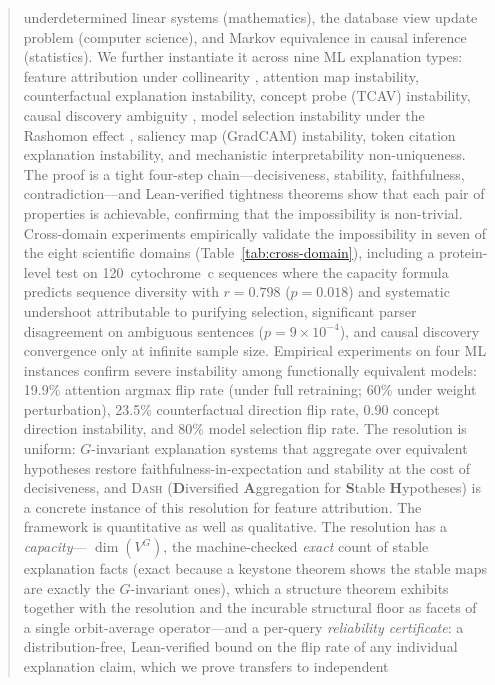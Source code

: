 \documentclass[11pt,a4paper]{article}
\newcommand{\DASH}{\textsc{Dash}}
\begin{document}
\begin{abstract}
underdetermined linear systems (mathematics), the database view update
problem (computer science), and Markov equivalence in causal inference
(statistics).  We further instantiate it across nine ML explanation types:
feature attribution under collinearity
\citep{bilodeau2024impossibility}, attention map instability, counterfactual
explanation instability, concept probe (TCAV) instability, causal discovery
ambiguity \citep{verma1991equivalence}, model selection instability under the
Rashomon effect \citep{rudin2024amazing,fisher2019models}, saliency map
(GradCAM) instability, token citation explanation instability, and
mechanistic interpretability non-uniqueness.
The proof is a tight four-step chain---decisiveness, stability, faithfulness,
contradiction---and Lean-verified tightness theorems show that each pair of
properties is achievable, confirming that the impossibility is non-trivial.
Cross-domain experiments empirically validate the impossibility in seven of
the eight scientific domains (Table~\ref{tab:cross-domain}), including a
protein-level test on 120~cytochrome~c sequences where the capacity
formula predicts sequence diversity with $r = 0.798$ ($p = 0.018$) and
systematic undershoot attributable to purifying selection,
significant parser disagreement on ambiguous sentences
($p = 9 \times 10^{-4}$), and causal discovery convergence only at infinite
sample size.
Empirical experiments on four ML instances confirm severe instability among
functionally equivalent models: 19.9\% attention argmax flip rate
(under full retraining; 60\% under weight perturbation), 23.5\%
counterfactual direction flip rate, 0.90 concept direction instability,
and 80\% model selection flip rate.
The resolution is uniform: $G$-invariant explanation systems that aggregate
over equivalent hypotheses restore faithfulness-in-expectation and stability at
the cost of decisiveness, and \DASH{} (\textbf{D}iversified \textbf{A}ggregation for
\textbf{S}table \textbf{H}ypotheses) is a concrete instance of this resolution for feature attribution.
The framework is quantitative as well as qualitative. The resolution has a \emph{capacity}---%
$\dim(V^G)$, the machine-checked \emph{exact} count of stable explanation facts (exact because a
keystone theorem shows the stable maps are exactly the $G$-invariant ones), which a structure
theorem exhibits together with the resolution and the incurable structural floor as facets of a
single orbit-average operator---and a per-query \emph{reliability certificate}: a distribution-free, Lean-verified bound
on the flip rate of any individual explanation claim, which we prove transfers to independent

\end{abstract}
\end{document}
